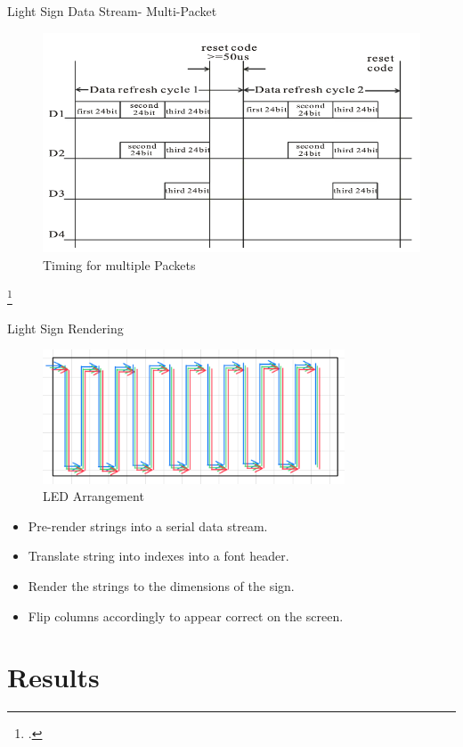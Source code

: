 \documentclass[10pt]{beamer}
\begin{document}
\begin{frame}{Light Sign Data Stream\-- Multi-Packet}
  \begin{figure}
    \centering
    \includegraphics[width=1.0\textwidth]{figures/multi_data.png}
    \caption{Timing for multiple Packets}
  \end{figure}
  \footcite{WS2812B}
\end{frame}

\begin{frame}{Light Sign Rendering}
  \begin{figure}
    \centering
    \includegraphics[width=0.8\textwidth]{figures/led_arr.png}
    \caption{LED Arrangement}
  \end{figure}
  \begin{itemize}
    \item Pre-render strings into a serial data stream.
    \item Translate string into indexes into a font header.
    \item Render the strings to the dimensions of the sign.
    \item Flip columns accordingly to appear correct on the screen.
  \end{itemize}
\end{frame}

\section{Results}
\end{document}
